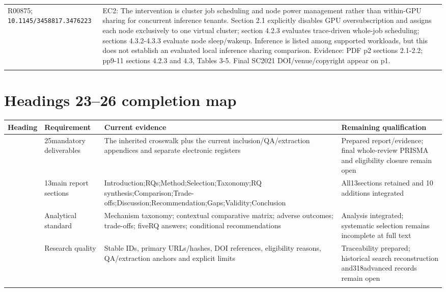 \begin{longtable}{>{\raggedright\arraybackslash}p{}>{\raggedright\arraybackslash}p{}}
R00875; \nolinkurl{10.1145/3458817.3476223} & EC2: The intervention is cluster job scheduling and node power management rather than within-GPU sharing for concurrent inference tenants. Section 2.1 explicitly disables GPU oversubscription and assigns each node exclusively to one virtual cluster;\allowbreak{} section 4.2.3 evaluates trace-driven whole-job scheduling;\allowbreak{} sections 4.3.2-4.3.3 evaluate node sleep/wakeup. Inference is listed among supported workloads,\allowbreak{} but this does not establish an evaluated local inference sharing comparison. Evidence: PDF p2 sections 2.1-2.2;\allowbreak{} pp9-11 sections 4.2.3 and 4.3,\allowbreak{} Tables 3-5. Final SC2021 DOI/venue/copyright appear on p1.\\\addlinespace
\bottomrule\end{longtable}
\clearpage\section{Headings 23--26 completion map}
\begin{longtable}{>{\raggedright\arraybackslash}p{}>{\raggedright\arraybackslash}p{}>{\raggedright\arraybackslash}p{}>{\raggedright\arraybackslash}p{}}
\toprule
\textbf{Heading} & \textbf{Requirement} & \textbf{Current evidence} & \textbf{Remaining qualification}\\\midrule\endhead
23 & 25mandatory deliverables & The inherited crosswalk plus the current inclusion/QA/extraction appendices and separate electronic registers & Prepared report/evidence;\allowbreak{} final whole-review PRISMA and eligibility closure remain open\\\addlinespace
24 & 13main report sections & Introduction;\allowbreak{}RQs;\allowbreak{}Method;\allowbreak{}Selection;\allowbreak{}Taxonomy;\allowbreak{}RQ synthesis;\allowbreak{}Comparison;\allowbreak{}Trade-offs;\allowbreak{}Discussion;\allowbreak{}Recommendation;\allowbreak{}Gaps;\allowbreak{}Validity;\allowbreak{}Conclusion & All13sections retained and 10 additions integrated\\\addlinespace
25 & Analytical standard & Mechanism taxonomy;\allowbreak{} contextual comparative matrix;\allowbreak{} adverse outcomes;\allowbreak{} trade-offs;\allowbreak{} fiveRQ answers;\allowbreak{} conditional recommendations & Analysis integrated;\allowbreak{} systematic selection remains incomplete at full text\\\addlinespace
26 & Research quality & Stable IDs,\allowbreak{} primary URLs/hashes,\allowbreak{} DOI references,\allowbreak{} eligibility reasons,\allowbreak{} QA/extraction anchors and explicit limits & Traceability prepared;\allowbreak{} historical search reconstruction and318advanced records remain open\\\addlinespace
\bottomrule\end{longtable}
